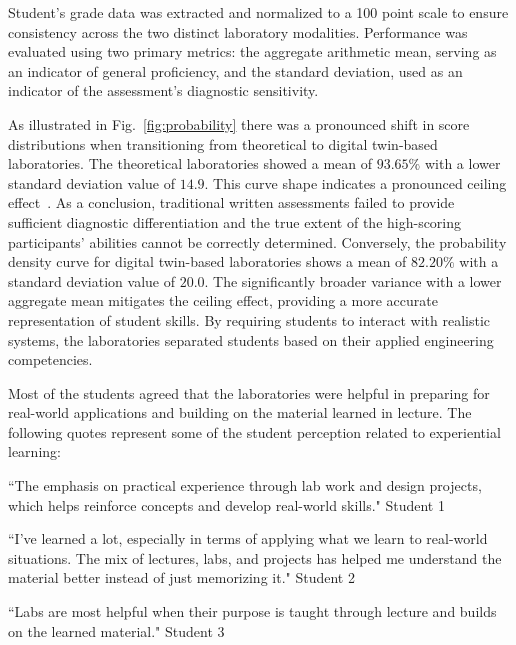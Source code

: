 \documentclass[journal]{IEEEtran}
\begin{document}
Student's grade data was extracted and normalized to a 100 point scale to ensure consistency across the two distinct laboratory modalities. %
Performance was evaluated using two primary metrics: the aggregate arithmetic mean, serving as an indicator of general proficiency, and the standard deviation, used as an indicator of the assessment’s diagnostic sensitivity.

As illustrated in Fig.~\ref{fig:probability} there was a pronounced shift in score distributions when transitioning from theoretical to digital twin-based laboratories. The theoretical laboratories showed a mean of $93.65\%$ with a lower standard deviation value of $14.9$. This curve shape indicates a pronounced ceiling effect~\cite{Wang2009, Uttl2005}. As a conclusion, traditional written assessments failed to provide sufficient diagnostic differentiation and the true extent of the high-scoring participants' abilities cannot be correctly determined.
%
Conversely, the probability density curve for digital twin-based laboratories shows a mean of $82.20\%$ with a standard deviation value of $20.0$. The significantly broader variance with a lower aggregate mean mitigates the ceiling effect, providing a more accurate representation of student skills. By requiring students to interact with realistic systems, the laboratories separated students based on their applied engineering competencies.

Most of the students agreed that the laboratories were helpful in preparing for real-world applications and building on the material learned in lecture. The following quotes represent some of the student perception related to experiential learning: 

\medskip

``The emphasis on practical experience through lab work and design projects, which helps reinforce concepts and develop real-world skills." Student 1

\medskip

``I’ve learned a lot, especially in terms of applying what we learn to real-world situations. The mix of lectures, labs, and projects has helped me understand the material better instead of just memorizing it." Student 2

\medskip

``Labs are most helpful when their purpose is taught through lecture and builds on the learned material." Student 3

\medskip
\end{document}

